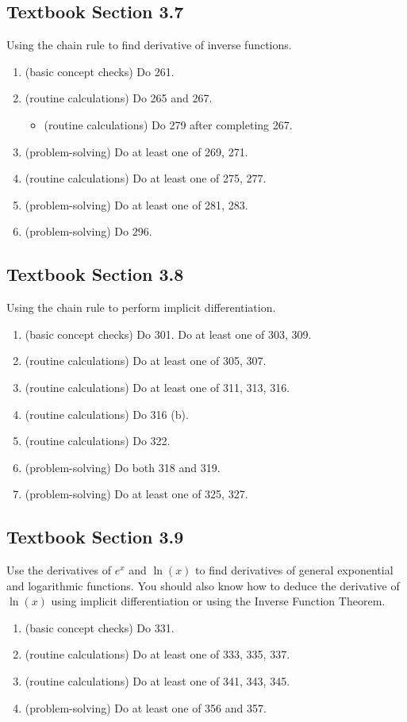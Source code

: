 \documentclass[./main.tex]{subfiles}
\begin{document}
\subsection*{Textbook Section 3.7}

Using the chain rule to find derivative of inverse functions.
\begin{enumerate}
  \item (basic concept checks) Do 261. 
  \item (routine calculations) Do 265 and 267.
    \begin{itemize}
      \item (routine calculations) Do 279 after completing 267.
    \end{itemize}
  \item (problem-solving) Do at least one of 269, 271. 
  \item (routine calculations) Do at least one of 275, 277.
  \item (problem-solving) Do at least one of 281, 283.
  \item (problem-solving) Do 296.
\end{enumerate}

\subsection*{Textbook Section 3.8}

Using the chain rule to perform implicit differentiation.
\begin{enumerate}
  \item (basic concept checks) Do 301. Do at least one of 303, 309.
  \item (routine calculations) Do at least one of 305, 307. 
  \item (routine calculations) Do at least one of 311, 313, 316.
  \item (routine calculations) Do 316 (b).
  \item (routine calculations) Do 322.
  \item (problem-solving) Do both 318 and 319.
  \item (problem-solving) Do at least one of 325, 327.
\end{enumerate}
\clearpage

\subsection*{Textbook Section 3.9}

Use the derivatives of \(e^{x}\) and \(\ln(x)\) to find derivatives of general exponential and logarithmic functions.  You should also know how to deduce the derivative of \(\ln(x)\) using implicit differentiation or using the Inverse Function Theorem.
\begin{enumerate}
  \item (basic concept checks) Do 331.
  \item (routine calculations) Do at least one of 333, 335, 337.
  \item (routine calculations) Do at least one of 341, 343, 345.
  \item (problem-solving) Do at least one of 356 and 357.
\end{enumerate}
\end{document}
